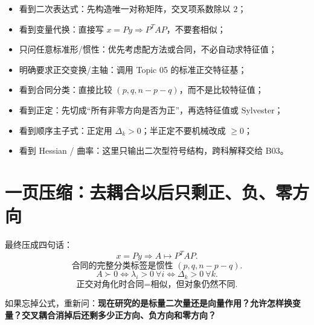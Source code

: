 \documentclass[11pt,a4paper]{ctexart}
\newcommand{\kw}[1]{\textbf{\color{deep}#1}}
\begin{document}
\begin{itemize}
  \item 看到二次表达式：先构造唯一对称矩阵，交叉项系数除以 $2$；
  \item 看到变量代换：直接写 $x=Py\Rightarrow P^TAP$，不要套相似；
  \item 只问任意标准形/惯性：优先考虑配方法或合同，不必自动求特征值；
  \item 明确要求正交变换/主轴：调用 Topic 05 的标准正交特征基；
  \item 看到合同分类：直接比较 $(p,q,n-p-q)$，而不是比较特征值；
  \item 看到正定：先切成“所有非零方向是否为正”，再选特征值或 Sylvester；
  \item 看到顺序主子式：正定用 $\Delta_k>0$；半正定不要机械改成 $\ge0$；
  \item 看到 Hessian / 曲率：这里只输出二次型符号结构，跨科解释交给 B03。
\end{itemize}

\section{一页压缩：去耦合以后只剩正、负、零方向}

\begin{center}
\end{center}

最终压成四句话：
\[
\boxed{x=Py\Longrightarrow A\mapsto P^TAP.}
\]
\[
\boxed{\text{合同的完整分类标签是惯性 }(p,q,n-p-q).}
\]
\[
\boxed{A\succ0\iff\lambda_i>0\ \forall i\iff\Delta_k>0\ \forall k.}
\]
\[
\boxed{\text{正交对角化时合同=相似，但对象仍然不同}.}
\]

如果忘掉公式，重新问：\kw{现在研究的是标量二次量还是向量作用？允许怎样换变量？交叉耦合消掉后还剩多少正方向、负方向和零方向？}
\end{document}
